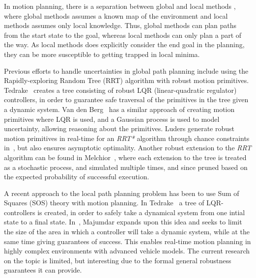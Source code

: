 
In motion planning, there is a separation between global and local methods
\cite{Hoy2015ClutteredEnvironmentSurvey}, where global methods assumes a known
map of the environment and local methods assumes only local knowledge. Thus,
global methods can plan paths from the start state to the goal, whereas local
methods can only plan a part of the way. As local methods does explicitly
consider the end goal in the planning, they can be more susceptible to getting
trapped in local minima.

Previous efforts to handle uncertainties in global path planning include using
the Rapidly-exploring Random Tree (RRT) algorithm with robust motion primitives.
Tedrake~\cite{tedrakeLQRtreesFeedbackMotion2009} creates a tree consisting of
robust LQR (linear-quadratic regulator) controllers, in order to guarantee safe
traversal of the primitives in the tree given a dynamic system. Van den
Berg~\cite{vandenbergLQGMPOptimizedPath2011} has a similar approach of creating
motion primitives where LQR is used, and a Gaussian process is used to model
uncertainty, allowing reasoning about the primitives. Luders generate robust
motion primitives in real-time for an \textit{RRT*} algorithm through chance
constraints in~\cite{luders2013robust}, but also ensures asymptotic optimality.
Another robust extension to the \textit{RRT} algorithm can be found in
Melchior~\cite{melchior2007particle}, where each extension to the tree is
treated as a stochastic process, and simulated multiple times, and since pruned
based on the expected probability of successful execution.



A recent approach to the local path planning problem has been to use Sum of
Squares (SOS) theory with motion planning. In
Tedrake~\cite{tedrakeLQRtreesFeedbackMotion2009} a tree of LQR-controllers is
created, in order to safely take a dynamical system from one intial state to a
final state. In~\cite{majumdarFunnelLibrariesRealtime2017}, Majumdar expands
upon this idea and seeks to limit the size of the area in which a controller
will take a dynamic system, while at the same time giving guarantees of success.
This enables real-time motion planning in highly complex environments with
advanced vehicle models. The current research on the topic is limited, but
interesting due to the formal general robustness guarantees it can provide.

